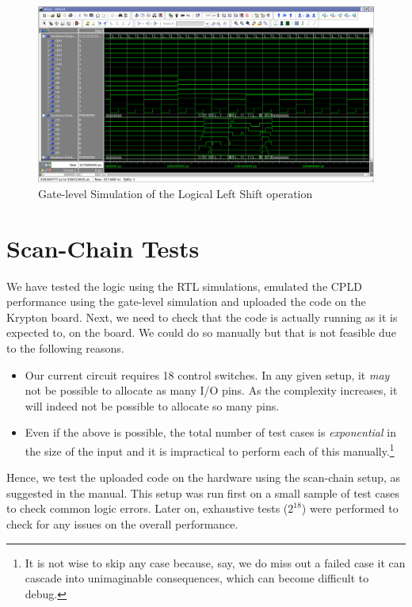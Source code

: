\documentclass[a4paper, 11pt]{article}
\begin{document}
\begin{figure}[H]
\centering
\includegraphics[scale=0.33]{leftshift_Gate}
\caption{Gate-level Simulation of the Logical Left Shift operation}
\end{figure}

\newpage
\section{Scan-Chain Tests}

We have tested the logic using the RTL simulations, emulated the CPLD performance using the gate-level simulation and uploaded the code on the Krypton board. Next, we need to check that the code is actually running as it is expected to, on the board. We could do so manually but that is not feasible due to the following reasons.
\begin{itemize}
	\item Our current circuit requires 18 control switches. In any given setup, it \emph{may} not be possible to allocate as many I/O pins. As the complexity increases, it will indeed not be possible to allocate so many pins.
	\item Even if the above is possible, the total number of test cases is \emph{exponential} in the size of the input and it is impractical to perform each of this manually.\footnote{It is not wise to skip any case because, say, we do miss out a failed case it can cascade into unimaginable consequences, which can become difficult to debug.}
\end{itemize}

Hence, we test the uploaded code on the hardware using the scan-chain setup, as suggested in the manual. This setup was run first on a small sample of test cases to check common logic errors. Later on, exhaustive tests ($2^{18}$) were performed to check for any issues on the overall performance.
\end{document}
